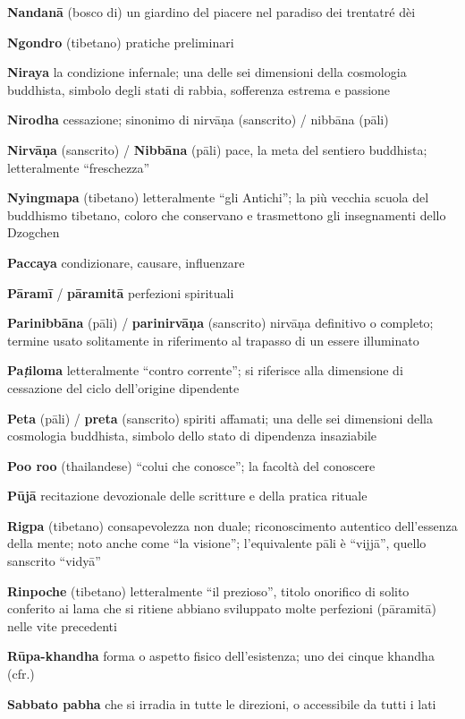 \textbf{Nandanā} (bosco di) un giardino del piacere nel paradiso dei trentatré dèi

\textbf{Ngondro} (tibetano) pratiche preliminari

\textbf{Niraya }la condizione infernale; una delle sei dimensioni della cosmologia buddhista, simbolo degli stati di rabbia, sofferenza estrema e passione

\textbf{Nirodha }cessazione; sinonimo di nirvāṇa (sanscrito) / nibbāna (pāli)

\textbf{Nirvāṇa} (sanscrito) / \textbf{Nibbāna} (pāli) pace, la meta del sentiero buddhista; letteralmente ``freschezza''

\textbf{Nyingmapa} (tibetano) letteralmente ``gli Antichi''; la più vecchia scuola del buddhismo tibetano, coloro che conservano e trasmettono gli insegnamenti dello Dzogchen

\textbf{Paccaya }condizionare, causare, influenzare

\textbf{Pāramī} / \textbf{pāramitā }perfezioni spirituali

\textbf{Parinibbāna} (pāli) / \textbf{parinirvāṇa} (sanscrito) nirvāṇa definitivo o completo; termine usato solitamente in riferimento al trapasso di un essere illuminato

\textbf{Pa}\textit{\textbf{ṭ}}\textbf{iloma }letteralmente ``contro corrente''; si riferisce alla dimensione di cessazione del ciclo dell'origine dipendente

\textbf{Peta} (pāli) / \textbf{preta} (sanscrito) spiriti affamati; una delle sei dimensioni della cosmologia buddhista, simbolo dello stato di dipendenza insaziabile

\textbf{Poo roo} (thailandese) ``colui che conosce''; la facoltà del conoscere

\textbf{Pūjā }recitazione devozionale delle scritture e della pratica rituale

\textbf{Rigpa} (tibetano) consapevolezza non duale; riconoscimento autentico dell'essenza della mente; noto anche come ``la visione''; l'equivalente pāli è ``vijjā'', quello sanscrito ``vidyā''

\textbf{Rinpoche} (tibetano) letteralmente ``il prezioso'', titolo onorifico di solito conferito ai lama che si ritiene abbiano sviluppato molte perfezioni (pāramitā) nelle vite precedenti

\textbf{Rūpa-khandha }forma o aspetto fisico dell'esistenza; uno dei cinque khandha (cfr.)

\textbf{Sabbato pabha }che si irradia in tutte le direzioni, o accessibile da tutti i lati

